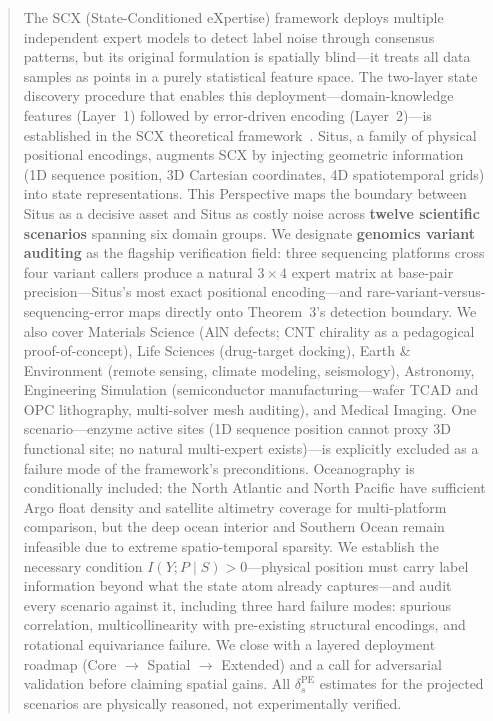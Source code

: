 \documentclass[12pt,a4paper]{article}
\begin{document}
\vspace{12pt}
\begin{abstract}
The SCX (State-Conditioned eXpertise) framework deploys multiple independent expert models to detect label noise through consensus patterns, but its original formulation is spatially blind—it treats all data samples as points in a purely statistical feature space. The two-layer state discovery procedure that enables this deployment—domain-knowledge features (Layer~1) followed by error-driven encoding (Layer~2)—is established in the SCX theoretical framework~\cite{paperI}. Situs, a family of physical positional encodings, augments SCX by injecting geometric information (1D sequence position, 3D Cartesian coordinates, 4D spatiotemporal grids) into state representations. This Perspective maps the boundary between Situs as a decisive asset and Situs as costly noise across \textbf{twelve scientific scenarios} spanning six domain groups. We designate \textbf{genomics variant auditing} as the flagship verification field: three sequencing platforms cross four variant callers produce a natural $3 \times 4$ expert matrix at base-pair precision—Situs's most exact positional encoding—and rare-variant-versus-sequencing-error maps directly onto Theorem~3's detection boundary. We also cover Materials Science (AlN defects; CNT chirality as a pedagogical proof-of-concept), Life Sciences (drug-target docking), Earth \& Environment (remote sensing, climate modeling, seismology), Astronomy, Engineering Simulation (semiconductor manufacturing—wafer TCAD and OPC lithography, multi-solver mesh auditing), and Medical Imaging. One scenario—enzyme active sites (1D sequence position cannot proxy 3D functional site; no natural multi-expert exists)—is explicitly excluded as a failure mode of the framework's preconditions. Oceanography is conditionally included: the North Atlantic and North Pacific have sufficient Argo float density and satellite altimetry coverage for multi-platform comparison, but the deep ocean interior and Southern Ocean remain infeasible due to extreme spatio-temporal sparsity. We establish the necessary condition $I(Y;P \mid S)>0$—physical position must carry label information beyond what the state atom already captures—and audit every scenario against it, including three hard failure modes: spurious correlation, multicollinearity with pre-existing structural encodings, and rotational equivariance failure. We close with a layered deployment roadmap (Core $\to$ Spatial $\to$ Extended) and a call for adversarial validation before claiming spatial gains. All $\delta_s^{\mathrm{PE}}$ estimates for the projected scenarios are physically reasoned, not experimentally verified.
\end{abstract}
\end{document}
